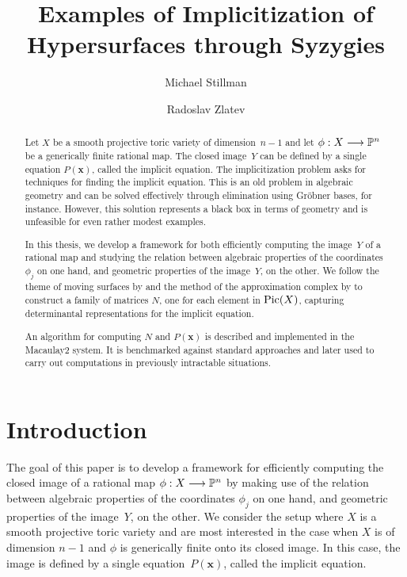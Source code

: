 \documentclass[fleqn,reqno]{amsart}
\author{Michael Stillman}
\author{Radoslav Zlatev}
\title{Examples of Implicitization of Hypersurfaces through Syzygies}
\begin{document}
\maketitle

\begin{abstract}
Let $X$ be a smooth projective toric variety of dimension~$n-1$
and let $\phi:X\longrightarrow\mathbb{P}^n$ be a generically finite rational map.
The closed image~$Y$ can be defined by a single equation $P(\mathbf x)$,
called the implicit equation.
The implicitization problem asks for techniques for finding the implicit equation.
This is an old problem in algebraic geometry and can be solved effectively
through elimination using Gr\"obner bases, for instance.
However, this solution represents
a black box in terms of geometry and is unfeasible for even rather modest examples.

In this thesis, we develop a framework for both
efficiently computing the image~$Y$ of a rational map and
studying the relation between algebraic properties of the coordinates $\phi_j$ on one hand,
and geometric properties of the image~$Y$, on the other.
We follow the theme of moving surfaces by \citet{CGZ-00} and
the method of the approximation complex by \citet{BJ-03}
to construct a family of matrices $N$, one for each element in $\operatorname{Pic}(X)$,
capturing determinantal representations for the implicit equation.

An algorithm for computing $N$ and $P(\mathbf x)$ is described and implemented in the Macaulay2 system.
It is benchmarked against standard approaches and
later used to carry out computations in previously intractable situations.
\end{abstract}





\section{Introduction}
\label{sec:intro}

\begin{paragraf*}
The goal of this paper is to develop a framework for
efficiently computing the closed image of a rational map $\phi:X\longrightarrow\mathbb{P}^n$ by
making use of the relation between algebraic properties of the coordinates $\phi_j$ on one hand,
and geometric properties of the image~$Y$, on the other.
We consider the setup where $X$ is a smooth projective toric variety
and are most interested in the case when $X$ is of dimension $n-1$ and
$\phi$ is generically finite onto its closed image.
In this case,
the image is defined by a single equation~$P(\mathbf x)$,
called the implicit equation.
\end{paragraf*}
\end{document}
